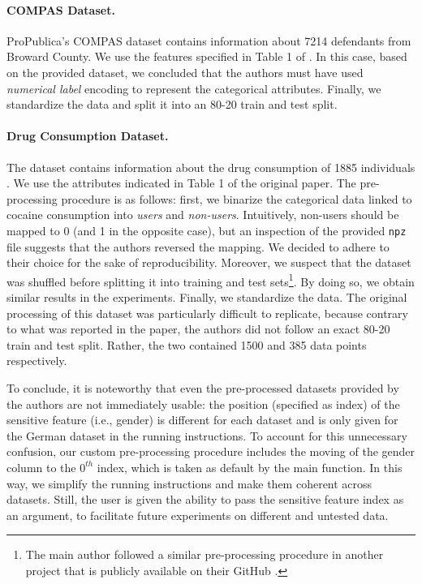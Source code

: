 \paragraph{COMPAS Dataset.} ProPublica’s COMPAS dataset \citep{compas_dataset} contains information about 7214 defendants from Broward County. We use the features specified in Table 1 of \citep{originalpaper}.
In this case, based on the provided dataset, we concluded that the authors must have used \textit{numerical label} encoding to represent the categorical attributes. Finally, we standardize the data and split it into an 80-20 train and test split.

\paragraph{Drug Consumption Dataset.} The dataset contains information about the drug consumption of 1885 individuals \citep{fehrman2017factor}. We use the attributes indicated in Table 1 of the original paper. The pre-processing procedure is as follows: first, we binarize the categorical data linked to cocaine consumption into \textit{users} and \textit{non-users}. Intuitively, non-users should be mapped to 0 (and 1 in the opposite case), but an inspection of the provided \texttt{npz} file suggests that the authors reversed the mapping. We decided to adhere to their choice for the sake of reproducibility. Moreover, we suspect that the dataset was shuffled before splitting it into training and test sets\footnote{The main author followed a similar pre-processing procedure in another project that is publicly available on their GitHub \cite{second_github}.}. By doing so, we obtain similar results in the experiments. Finally, we standardize the data. The original processing of this dataset was particularly difficult to replicate, because contrary to what was reported in the paper, the authors did not follow an exact 80-20 train and test split. Rather, the two contained 1500 and 385 data points respectively.

To conclude, it is noteworthy that even the pre-processed datasets provided by the authors are not immediately usable: the position (specified as index) of the sensitive feature (i.e., gender) is different for each dataset and is only given for the German dataset in the running instructions. To account for this unnecessary confusion, our custom pre-processing procedure includes the moving of the gender column to the $0^{th}$ index, which is taken as default by the main function. In this way, we simplify the running instructions and make them coherent across datasets. Still, the user is given the ability to pass the sensitive feature index as an argument, to facilitate future experiments on different and untested data.

